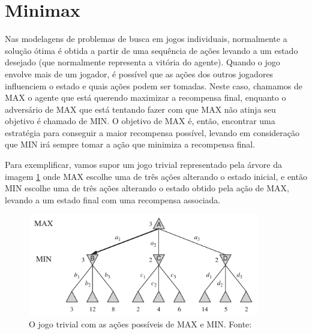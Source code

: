 \section{Minimax}
Nas modelagens de problemas de busca em jogos individuais, normalmente a solução ótima é obtida a partir de uma sequência de ações levando a um estado desejado (que normalmente representa a vitória do agente). Quando o jogo envolve mais de um jogador, é possível que as ações dos outros jogadores influenciem o estado e quais ações podem ser tomadas. Neste caso, chamamos de MAX o agente que está querendo maximizar a recompensa final, enquanto o adversário de MAX que está tentando fazer com que MAX não atinja seu objetivo é chamado de MIN. O objetivo de MAX é, então, encontrar uma estratégia para conseguir a maior recompensa possível, levando em consideração que MIN irá sempre tomar a ação que minimiza a recompensa final.

Para exemplificar, vamos supor um jogo trivial representado pela árvore da imagem \ref{minimax} onde MAX escolhe uma de três ações alterando o estado inicial, e então MIN escolhe uma de três ações alterando o estado obtido pela ação de MAX, levando a um estado final com uma recompensa associada.

\begin{figure}[!h]
        \centering
            \includegraphics[width=0.9\textwidth]{picstcc/minimax.png}
            \caption{O jogo trivial com as ações possíveis de MAX e MIN. Fonte: \cite[p. 164]{livro}}
            \label{minimax}
\end{figure}

